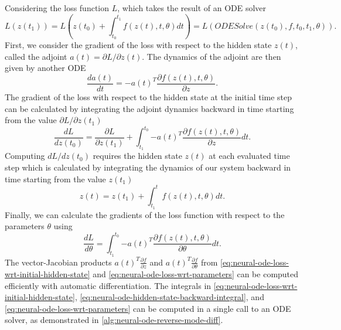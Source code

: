 Considering the loss function $L$, which takes the result of an \gls{ODE} solver \cite{chenNeuralOrdinaryDifferential2019}
\begin{equation*}
    L(z(t_1)) = L\left(z(t_0) + \int_{t_0}^{t_1}{f(z(t), t, \theta)dt}\right) = L(ODESolve(z(t_0), f, t_0, t_1, \theta)).
\end{equation*}
First, we consider the gradient of the loss with respect to the hidden state $z(t)$, called the adjoint $a(t) = \partial L / \partial z(t)$.
The dynamics of the adjoint are then given by another \gls{ODE} \cite{chenNeuralOrdinaryDifferential2019}
\begin{equation*}
    \frac{da(t)}{dt} = -a(t)^T\frac{\partial f(z(t), t, \theta)}{\partial z}.
\end{equation*}
The gradient of the loss with respect to the hidden state at the initial time step can be calculated by integrating the adjoint dynamics backward in time starting from the value $\partial L / \partial z(t_1)$ \cite{chenNeuralOrdinaryDifferential2019}
\begin{equation}
    \frac{dL}{dz(t_0)} = \frac{\partial L}{\partial z(t_1)} + \int_{t_1}^{t_0}{-a(t)^T\frac{\partial f(z(t), t, \theta)}{\partial z}} dt.
    \label{eq:neural-ode-loss-wrt-initial-hidden-state}
\end{equation}
Computing $dL/dz(t_0)$ requires the hidden state $z(t)$ at each evaluated time step which is calculated by integrating the dynamics of our system backward in time starting from the value $z(t_1)$ \cite{chenNeuralOrdinaryDifferential2019}
\begin{equation}
    z(t) = z(t_1) + \int_{t_1}^{t}{f(z(t), t, \theta)dt}.
    \label{eq:neural-ode-hidden-state-backward-integral}
\end{equation}
Finally, we can calculate the gradients of the loss function with respect to the parameters $\theta$ using \cite{chenNeuralOrdinaryDifferential2019}
\begin{equation}
    \frac{dL}{d\theta} = \int_{t_1}^{t_0}{-a(t)^T\frac{\partial f(z(t), t, \theta)}{\partial \theta}} dt.
    \label{eq:neural-ode-loss-wrt-parameters}
\end{equation}
The vector-Jacobian products $a(t)^T\frac{\partial f}{\partial z}$ and $a(t)^T\frac{\partial f}{\partial \theta}$ from \autoref{eq:neural-ode-loss-wrt-initial-hidden-state} and \autoref{eq:neural-ode-loss-wrt-parameters} can be computed efficiently with automatic differentiation.
The integrals in \autoref{eq:neural-ode-loss-wrt-initial-hidden-state}, \autoref{eq:neural-ode-hidden-state-backward-integral}, and \autoref{eq:neural-ode-loss-wrt-parameters} can be computed in a single call to an \gls{ODE} solver, as demonstrated in \autoref{alg:neural-ode-reverse-mode-diff}.